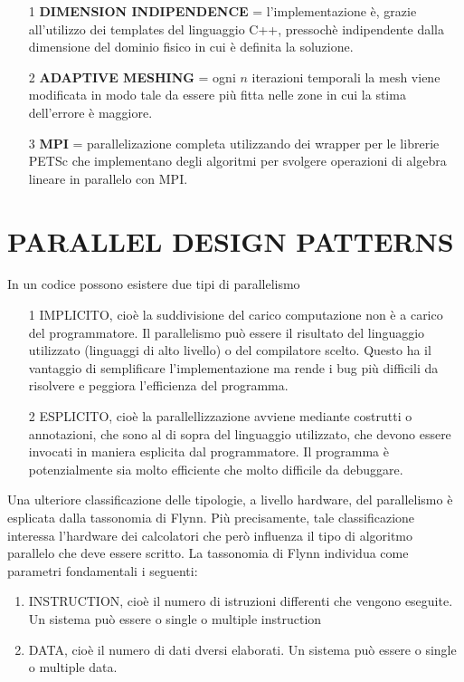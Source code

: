 \documentclass[italian]{article}
\begin{document}
\begin{enumerate}
\item[1] \textbf{DIMENSION INDIPENDENCE} = l'implementazione è, grazie all'utilizzo dei templates del linguaggio C++, pressochè indipendente dalla dimensione del dominio fisico in cui è definita la soluzione.
\item[2] \textbf{ADAPTIVE MESHING} = ogni $n$ iterazioni temporali la mesh viene modificata in modo tale da essere più fitta nelle zone in cui la stima dell'errore è maggiore.
\item[3] \textbf{MPI} = parallelizazione completa utilizzando dei wrapper per le librerie PETSc che implementano degli algoritmi per svolgere operazioni di algebra lineare in parallelo con MPI.
\end{enumerate}

\section{PARALLEL DESIGN PATTERNS}
In un codice possono esistere due tipi di parallelismo
\begin{enumerate}
\item[1] IMPLICITO, cioè la suddivisione del carico computazione non è a carico del programmatore. Il parallelismo può essere il risultato del linguaggio utilizzato (linguaggi di alto livello) o del compilatore scelto. Questo ha il vantaggio di semplificare l'implementazione ma rende i bug più difficili da risolvere e peggiora l'efficienza del programma.
\item[2] ESPLICITO, cioè la parallellizzazione avviene mediante costrutti o annotazioni, che sono al di sopra del linguaggio utilizzato, che devono essere invocati in maniera esplicita dal programmatore. Il programma è potenzialmente sia molto efficiente che molto difficile da debuggare.
\end{enumerate}
Una ulteriore classificazione delle tipologie, a livello hardware, del parallelismo è esplicata dalla tassonomia di Flynn. Più precisamente, tale classificazione interessa l'hardware dei calcolatori che però influenza il tipo di algoritmo parallelo che deve essere scritto. La tassonomia di Flynn individua come parametri fondamentali i seguenti:
\begin{enumerate}
\item INSTRUCTION, cioè il numero di istruzioni differenti che vengono eseguite. Un sistema può essere o single o multiple instruction
\item DATA, cioè il numero di dati dversi elaborati. Un sistema può essere o single o multiple data.
\end{enumerate}
\end{document}
